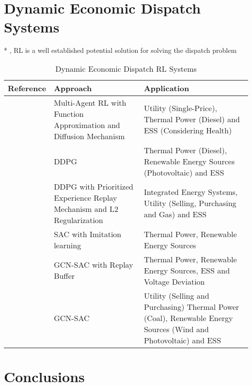 \section{Dynamic Economic Dispatch Systems} \label{sec:ded}

* \cite{pereraApplicationsReinforcementLearning2021}, RL is a well established potential solution for solving the dispatch problem


\begin{table}[h!]
	\centering
	\caption{Dynamic Economic Dispatch \ac{RL} Systems}
	\begin{tabular}{|P{2cm}|P{4cm}|p{6cm}|  }
		\hline
		\textbf{Reference} & \textbf{Approach} & \textbf{Application} \\
		\hline
		
 		\cite{liuDistributedEconomicDispatch2018b} & Multi-Agent \ac{RL} with Function Approximation and Diffusion Mechanism & Utility (Single-Price), Thermal Power (Diesel) and \ac{ESS} (Considering Health)\\
 		\hline
 		\cite{leiDynamicEnergyDispatch2021} & DDPG & Thermal Power (Diesel), Renewable Energy Sources (Photovoltaic) and \ac{ESS} \\
 		\hline 
 		\cite{yangDynamicEnergyDispatch2021} & DDPG with Prioritized Experience Replay Mechanism and L2 Regularization& Integrated Energy Systems, Utility (Selling, Purchasing and Gas) and \ac{ESS} \\
 		\hline
 		\cite{hanAutonomousControlTechnology2023} & SAC with Imitation learning & Thermal Power, Renewable Energy Sources \\
 		\hline
 		\cite{chenScalableGraphReinforcement2023} & GCN-SAC with Replay Buffer & Thermal Power, Renewable Energy Sources, \ac{ESS} and Voltage Deviation \\
 		\hline
 		\cite{liNovelGraphReinforcement2022} & GCN-SAC & Utility (Selling and Purchasing) Thermal Power (Coal), Renewable Energy Sources (Wind and Photovoltaic) and \ac{ESS} \\
 		\hline
	\end{tabular}
\end{table}


\section{Conclusions}

